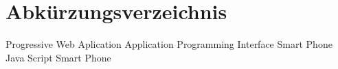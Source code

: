 \chapter*{Abkürzungsverzeichnis}
\pagestyle{plain}

\begin{acronym}[AUTOSAR]

   				{Progressive Web Aplication}
  				{Application Programming Interface}
  				{Smart Phone}
  				{Java Script}
  				{Smart Phone}

\end{acronym}